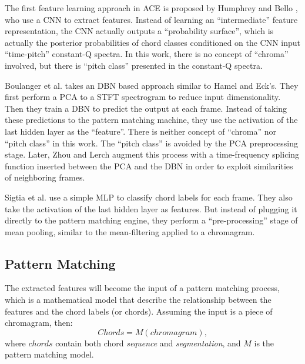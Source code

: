 The first feature learning approach in ACE is proposed by Humphrey and Bello \cite{humphrey2012rethinking}, who use a CNN to extract features. Instead of learning an ``intermediate'' feature representation, the CNN actually outputs a ``probability surface'', which is actually the posterior probabilities of chord classes conditioned on the CNN input ``time-pitch'' constant-Q spectra. In this work, there is no concept of ``chroma'' involved, but there is ``pitch class'' presented in the constant-Q spectra.

Boulanger et al. \cite{boulanger2013audio} takes an DBN based approach similar to Hamel and Eck's. They first perform a PCA to a STFT spectrogram to reduce input dimensionality. Then they train a DBN to predict the output at each frame. Instead of taking these predictions to the pattern matching machine, they use the activation of the last hidden layer as the ``feature''. There is neither concept of ``chroma'' nor ``pitch class'' in this work. The ``pitch class'' is avoided by the PCA preprocessing stage. Later, Zhou and Lerch \cite{zhou2015chord} augment this process with a time-frequency splicing function inserted between the PCA and the DBN in order to exploit similarities of neighboring frames.

Sigtia et al. \cite{sigtia2015audio} use a simple MLP to classify chord labels for each frame. They also take the activation of the last hidden layer as features. But instead of plugging it directly to the pattern matching engine, they perform a ``pre-processing'' stage of mean pooling, similar to the mean-filtering applied to a chromagram.


\subsection{Pattern Matching} \label{sec:2-pm}
The extracted features will become the input of a pattern matching process, which is a mathematical model that describe the relationship between the features and the chord labels (or chords). Assuming the input is a piece of chromagram, then:
\begin{equation}
Chords = M(chromagram),
\end{equation}
where $chords$ contain both chord {\it sequence} and {\it segmentation}, and $M$ is the pattern matching model.

